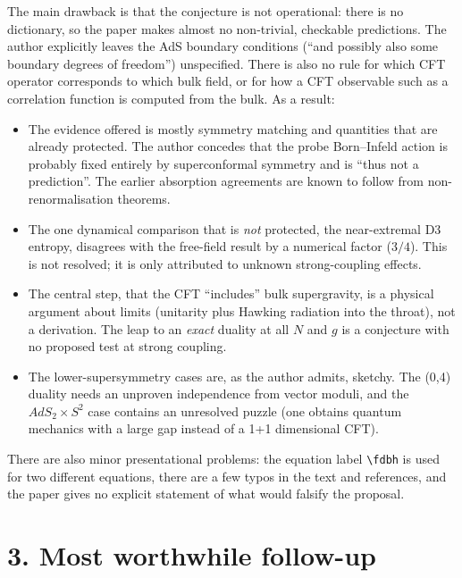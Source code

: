 \documentclass[11pt,a4paper]{article}
\begin{document}
The main drawback is that the conjecture is not operational: there is no dictionary, so the paper makes almost no non-trivial, checkable predictions. The author explicitly leaves the AdS boundary conditions (``and possibly also some boundary degrees of freedom'') unspecified. There is also no rule for which CFT operator corresponds to which bulk field, or for how a CFT observable such as a correlation function is computed from the bulk. As a result:
\begin{itemize}
\item The evidence offered is mostly symmetry matching and quantities that are already protected. The author concedes that the probe Born--Infeld action is probably fixed entirely by superconformal symmetry and is ``thus not a prediction''. The earlier absorption agreements are known to follow from non-renormalisation theorems.
\item The one dynamical comparison that is \emph{not} protected, the near-extremal D3 entropy, disagrees with the free-field result by a numerical factor ($3/4$). This is not resolved; it is only attributed to unknown strong-coupling effects.
\item The central step, that the CFT ``includes'' bulk supergravity, is a physical argument about limits (unitarity plus Hawking radiation into the throat), not a derivation. The leap to an \emph{exact} duality at all $N$ and $g$ is a conjecture with no proposed test at strong coupling.
\item The lower-supersymmetry cases are, as the author admits, sketchy. The (0,4) duality needs an unproven independence from vector moduli, and the $AdS_2\times S^2$ case contains an unresolved puzzle (one obtains quantum mechanics with a large gap instead of a 1+1 dimensional CFT).
\end{itemize}
There are also minor presentational problems: the equation label \texttt{\textbackslash fdbh} is used for two different equations, there are a few typos in the text and references, and the paper gives no explicit statement of what would falsify the proposal.

\section*{3. Most worthwhile follow-up}
\end{document}
